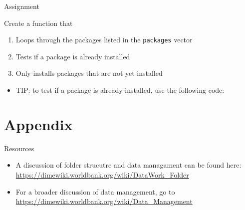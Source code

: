 \documentclass[ignorenonframetext,]{beamer}
\newenvironment{Shaded}{\begin{snugshade}}{\end{snugshade}}
\newcommand{\KeywordTok}[1]{\textcolor[rgb]{0.13,0.29,0.53}{\textbf{#1}}}
\newcommand{\StringTok}[1]{\textcolor[rgb]{0.31,0.60,0.02}{#1}}
\newcommand{\CommentTok}[1]{\textcolor[rgb]{0.56,0.35,0.01}{\textit{#1}}}
\newcommand{\OperatorTok}[1]{\textcolor[rgb]{0.81,0.36,0.00}{\textbf{#1}}}
\newcommand{\NormalTok}[1]{#1}
\providecommand{\tightlist}{%
  \setlength{\itemsep}{0pt}\setlength{\parskip}{0pt}}
\begin{document}
\begin{frame}[fragile]{Assignment}

Create a function that

\begin{enumerate}
\def\labelenumi{\arabic{enumi}.}
\item
  Loops through the packages listed in the \texttt{packages} vector
\item
  Tests if a package is already installed
\item
  Only installs packages that are not yet installed
\end{enumerate}

\begin{itemize}
\tightlist
\item
  TIP: to test if a package is already installed, use the following
  code:
\end{itemize}

\begin{Shaded}
\end{Shaded}

\end{frame}

\section{Appendix}\label{appendix}

\begin{frame}{Resources}

\begin{itemize}
\tightlist
\item
  A discussion of folder strucutre and data managament can be found
  here: \url{https://dimewiki.worldbank.org/wiki/DataWork_Folder}
\item
  For a broader discussion of data management, go to
  \url{https://dimewiki.worldbank.org/wiki/Data_Management}
\end{itemize}

\end{frame}
\end{document}
